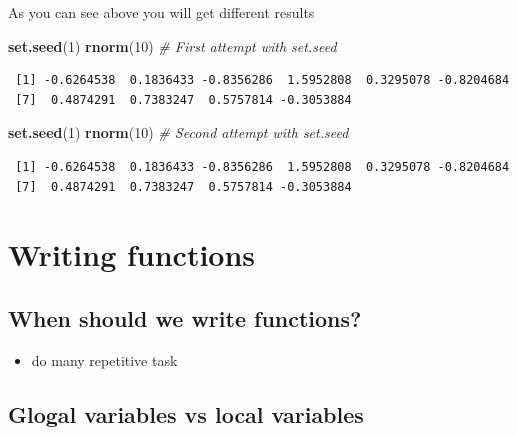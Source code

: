 \documentclass[
]{book}
\newenvironment{Shaded}{\begin{snugshade}}{\end{snugshade}}
\newcommand{\CommentTok}[1]{\textcolor[rgb]{0.56,0.35,0.01}{\textit{#1}}}
\newcommand{\DecValTok}[1]{\textcolor[rgb]{0.00,0.00,0.81}{#1}}
\newcommand{\KeywordTok}[1]{\textcolor[rgb]{0.13,0.29,0.53}{\textbf{#1}}}
\newcommand{\NormalTok}[1]{#1}
\providecommand{\tightlist}{%
  \setlength{\itemsep}{0pt}\setlength{\parskip}{0pt}}
\begin{document}
As you can see above you will get different results

\begin{Shaded}
\begin{Highlighting}[]
\KeywordTok{set.seed}\NormalTok{(}\DecValTok{1}\NormalTok{)}
\KeywordTok{rnorm}\NormalTok{(}\DecValTok{10}\NormalTok{) }\CommentTok{# First attempt with set.seed}
\end{Highlighting}
\end{Shaded}

\begin{verbatim}
 [1] -0.6264538  0.1836433 -0.8356286  1.5952808  0.3295078 -0.8204684
 [7]  0.4874291  0.7383247  0.5757814 -0.3053884
\end{verbatim}

\begin{Shaded}
\begin{Highlighting}[]
\KeywordTok{set.seed}\NormalTok{(}\DecValTok{1}\NormalTok{)}
\KeywordTok{rnorm}\NormalTok{(}\DecValTok{10}\NormalTok{) }\CommentTok{# Second attempt with set.seed}
\end{Highlighting}
\end{Shaded}

\begin{verbatim}
 [1] -0.6264538  0.1836433 -0.8356286  1.5952808  0.3295078 -0.8204684
 [7]  0.4874291  0.7383247  0.5757814 -0.3053884
\end{verbatim}

\hypertarget{writing-functions}{%
\chapter{Writing functions}\label{writing-functions}}

\hypertarget{when-should-we-write-functions}{%
\section{When should we write functions?}\label{when-should-we-write-functions}}

\begin{itemize}
\tightlist
\item
  do many repetitive task
\end{itemize}

\hypertarget{glogal-variables-vs-local-variables}{%
\section{Glogal variables vs local variables}\label{glogal-variables-vs-local-variables}}
\end{document}
